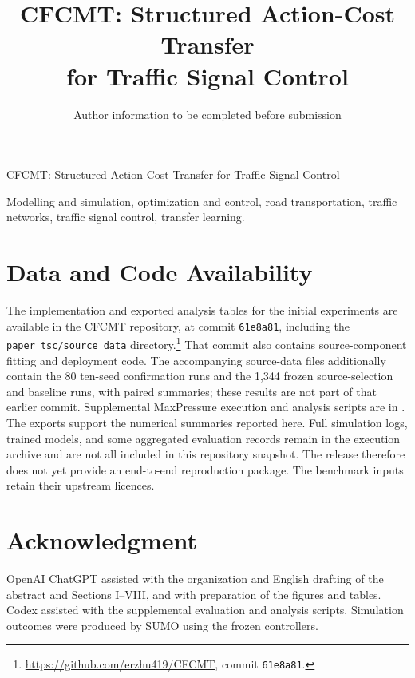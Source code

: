 \documentclass[letterpaper,journal]{IEEEtran}
\begin{document}
\title{CFCMT: Structured Action-Cost Transfer\\for Traffic Signal Control}
\author{Author information to be completed before submission}
%
{CFCMT: Structured Action-Cost Transfer for Traffic Signal Control}
\maketitle

\begin{IEEEkeywords}
Modelling and simulation, optimization and control, road transportation, traffic networks, traffic signal control, transfer learning.
\end{IEEEkeywords}








\section*{Data and Code Availability}
\begingroup\raggedright
The implementation and exported analysis tables for the initial experiments are available in the CFCMT repository, at commit \texttt{61e8a81}, including the \texttt{paper\_tsc/source\_data} directory.\footnote{\url{https://github.com/erzhu419/CFCMT}, commit \texttt{61e8a81}.}
That commit also contains source-component fitting and deployment code. The accompanying source-data files additionally contain the 80 ten-seed confirmation runs and the 1,344 frozen source-selection and baseline runs, with paired summaries; these results are not part of that earlier commit. Supplemental MaxPressure execution and analysis scripts are in .
The exports support the numerical summaries reported here. Full simulation logs, trained models, and some aggregated evaluation records remain in the execution archive and are not all included in this repository snapshot. The release therefore does not yet provide an end-to-end reproduction package. The benchmark inputs retain their upstream licences.
\par\endgroup
\section*{Acknowledgment}
OpenAI ChatGPT assisted with the organization and English drafting of the abstract and Sections I--VIII, and with preparation of the figures and tables. Codex assisted with the supplemental evaluation and analysis scripts. Simulation outcomes were produced by SUMO using the frozen controllers.




\end{document}
